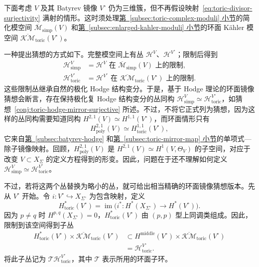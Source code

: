 下面考虑 $V$ 及其 Batyrev 镜像 $V^\circ$ 仍为三维簇，但不再假设映射~\eqref{eq:toric-divisor-surjectivity} 满射的情形。这时须处理\hyperref[subsec:toric-complex-moduli]{第~\ref*{subsec:toric-complex-moduli} 小节}的简化模空间 $\overline{\mathcal M}_{\mathrm{simp}}(V)$ 和\hyperref[subsec:enlarged-kahler-moduli]{第~\ref*{subsec:enlarged-kahler-moduli} 小节}的环面 Kähler 模空间 $\overline{\mathcal{KM}}_{\mathrm{toric}}(V^\circ)$。

一种提出猜想的方式如下。完整模空间上有丛 $\mathcal H^V$、$\mathcal H^{V^\circ}$；限制后得到
\[
\begin{aligned}
\mathcal H^V_{\mathrm{simp}}&=\mathcal H^V\text{ 在 }\overline{\mathcal M}_{\mathrm{simp}}(V)\text{ 上的限制},\\
\mathcal H^{V^\circ}_{\mathrm{toric}}&=\mathcal H^{V^\circ}\text{ 在 }\overline{\mathcal{KM}}_{\mathrm{toric}}(V^\circ)\text{ 上的限制}.
\end{aligned}
\]
这些限制丛继承自然的极化 Hodge 结构变分。于是，基于 Hodge 理论的环面镜像猜想会断言，存在保持极化复 Hodge 结构变分的丛同构 $\mathcal H^V_{\mathrm{simp}}\simeq\mathcal H^{V^\circ}_{\mathrm{toric}}$，如猜想~\ref{conj:toric-hodge-mirror-surjective} 所述。不过，不将它正式列为猜想，因为这样的丛同构需要知道同构 $H^{2,1}(V)\simeq H^{1,1}(V^\circ)$，而环面情形只有
\[
H^{2,1}_{\mathrm{poly}}(V)\simeq H^{1,1}_{\mathrm{toric}}(V^\circ),
\]
它来自\hyperref[subsec:batyrev-hodge]{第~\ref*{subsec:batyrev-hodge}} 和\hyperref[subsec:toric-mirror-map]{第~\ref*{subsec:toric-mirror-map} 小节}的单项式—除子镜像映射。回顾，$H^{2,1}_{\mathrm{poly}}(V)$ 是 $H^{2,1}(V)\simeq H^1(V,\Theta_V)$ 的子空间，对应于改变 $V\subset X_\Sigma$ 的定义方程得到的形变。因此，问题在于还不理解如何定义 $\mathcal H^V_{\mathrm{simp}}\simeq\mathcal H^{V^\circ}_{\mathrm{toric}}$。

不过，若将这两个丛替换为略小的丛，就可给出相当精确的环面镜像猜想版本。先从 $V^\circ$ 开始。令 $i:V^\circ\hookrightarrow X_{\Sigma^\circ}$ 为包含映射，定义
\[
H^*_{\mathrm{toric}}(V^\circ)=\operatorname{im}\bigl(i^*:H^*(X_{\Sigma^\circ})\longrightarrow H^*(V^\circ)\bigr).
\]
因为 $p\ne q$ 时 $H^{p,q}(X_{\Sigma^\circ})=0$，$H^*_{\mathrm{toric}}(V^\circ)$ 由 $(p,p)$ 型上同调类组成。因此，限制到该空间得到子丛
\[
\begin{aligned}
H^*_{\mathrm{toric}}(V^\circ)\times\overline{\mathcal{KM}}_{\mathrm{toric}}(V^\circ)
&\subset H^{\mathrm{middle}}(V^\circ)\times\overline{\mathcal{KM}}_{\mathrm{toric}}(V^\circ)\\
&=\mathcal H^{V^\circ}_{\mathrm{toric}}.
\end{aligned}
\]
将此子丛记为 $\mathcal T\mathcal H^{V^\circ}_{\mathrm{toric}}$，其中 $\mathcal T$ 表示所用的环面子环。

